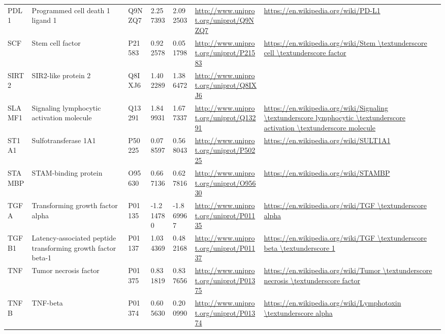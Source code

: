 \begin{table}[H]
{\begin{tabular}{ lllllll }
        \multicolumn{1}{l|}{ PDL1 } &  Programmed cell death 1 ligand 1   & Q9NZQ7   & 2.257393   & 2.092503   & \url{http://www.uniprot.org/uniprot/Q9NZQ7}   & \url{https://en.wikipedia.org/wiki/PD-L1}          \\ 
        \multicolumn{1}{l|}{ SCF } &  Stem cell factor   & P21583   & 0.922578   & 0.051798   & \url{http://www.uniprot.org/uniprot/P21583}   & \url{https://en.wikipedia.org/wiki/Stem \textunderscore cell \textunderscore factor}          \\ 
        \multicolumn{1}{l|}{ SIRT2 } &  SIR2-like protein 2   & Q8IXJ6   & 1.402289   & 1.386472   & \url{http://www.uniprot.org/uniprot/Q8IXJ6}   &           \\ 
        \multicolumn{1}{l|}{ SLAMF1 } &  Signaling lymphocytic activation molecule   & Q13291   & 1.849931   & 1.677337   & \url{http://www.uniprot.org/uniprot/Q13291}   & \url{https://en.wikipedia.org/wiki/Signaling \textunderscore lymphocytic \textunderscore activation \textunderscore molecule}          \\ 
        \multicolumn{1}{l|}{ ST1A1 } &  Sulfotransferase 1A1   & P50225   & 0.078597   & 0.568043   & \url{http://www.uniprot.org/uniprot/P50225}   & \url{https://en.wikipedia.org/wiki/SULT1A1}          \\ 
        \multicolumn{1}{l|}{ STAMBP } &  STAM-binding protein   & O95630   & 0.667136   & 0.627816   & \url{http://www.uniprot.org/uniprot/O95630}   & \url{https://en.wikipedia.org/wiki/STAMBP}          \\ 
        \multicolumn{1}{l|}{ TGFA } &  Transforming growth factor alpha   & P01135   & -1.214780   & -1.869967   & \url{http://www.uniprot.org/uniprot/P01135}   & \url{https://en.wikipedia.org/wiki/TGF \textunderscore alpha}          \\ 
        \multicolumn{1}{l|}{ TGFB1 } &  Latency-associated peptide transforming growth factor beta-1   & P01137   & 1.034369   & 0.482168   & \url{http://www.uniprot.org/uniprot/P01137}   & \url{https://en.wikipedia.org/wiki/TGF \textunderscore beta \textunderscore 1}          \\ 
        \multicolumn{1}{l|}{ TNF } &  Tumor necrosis factor   & P01375   & 0.831819   & 0.837656   & \url{http://www.uniprot.org/uniprot/P01375}   & \url{https://en.wikipedia.org/wiki/Tumor \textunderscore necrosis \textunderscore factor}          \\ 
        \multicolumn{1}{l|}{ TNFB } &  TNF-beta   & P01374   & 0.605630   & 0.200990   & \url{http://www.uniprot.org/uniprot/P01374}   & \url{https://en.wikipedia.org/wiki/Lymphotoxin \textunderscore alpha}          \\ 

\end{tabular}}
\end{table}
